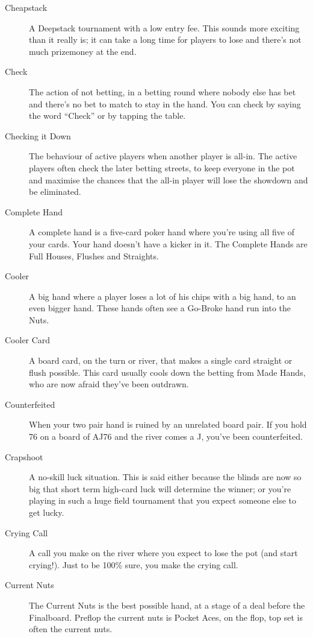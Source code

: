 \begin{description}
\item[Cheapstack] A Deepstack tournament with a low entry fee. This
sounds more exciting than it really is; it can take a long time for
players to lose and there's not much prizemoney at the end.

\item[Check] The action of not betting, in a betting round where
nobody else has bet and there's no bet to match to stay in the hand.
You can check by saying the word ``Check'' or by tapping the table.

\item[Checking it Down] The behaviour of active players when another
player is all-in. The active players often check the later betting
streets, to keep everyone in the pot and maximise the chances that the
all-in player will lose the showdown and be eliminated.

\item[Complete Hand] A complete hand is a five-card poker hand where
you're using all five of your cards. Your hand doesn't have a kicker
in it. The Complete Hands are Full Houses, Flushes and Straights.

\item[Cooler] A big hand where a player loses a lot of his chips with
a big hand, to an even bigger hand. These hands often see a Go-Broke
hand run into the Nuts.

\item[Cooler Card] A board card, on the turn or river, that makes a
single card straight or flush possible. This card usually cools down
the betting from Made Hands, who are now afraid they've been outdrawn.

\item[Counterfeited] When your two pair hand is ruined by an unrelated
board pair. If you hold 76 on a board of AJ76 and the river comes a J,
you've been counterfeited.

\item[Crapshoot] A no-skill luck situation. This is said either
because the blinds are now so big that short term high-card luck will
determine the winner; or you're playing in such a huge field
tournament that you expect someone else to get lucky.

\item[Crying Call] A call you make on the river where you expect to
lose the pot (and start crying!). Just to be 100\% sure, you make the
crying call.

\item[Current Nuts] The Current Nuts is the best possible hand, at a
stage of a deal before the Finalboard. Preflop the current nuts is
Pocket Aces, on the flop, top set is often the current nuts.


\end{description}
